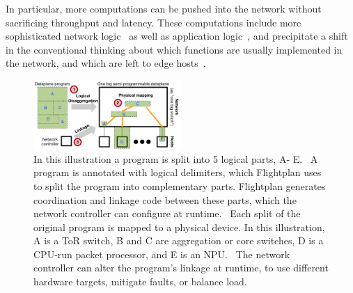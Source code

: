 \documentclass[letterpaper,twocolumn,10pt]{article}
\begin{document}
In particular, more computations can be pushed into the network
without sacrificing throughput and latency.  These computations
include more sophisticated network
logic~\cite{Giesen:2018:ICR:3229591.3229595} as well as application
logic~\cite{Jin:2017:NBK:3132747.3132764}, and precipitate a shift in
the conventional thinking about which functions are usually implemented
in the network, and which are left to edge
hosts~\cite{Saltzer:1984:EAS:357401.357402}.

\begin{figure}[t]
\centering
\includegraphics[width=0.5\textwidth]{overview.pdf}
\caption{\label{fig:overview}In this illustration a program is split into 5 logical parts, {\sf\color{blue} A}-{\sf\color{blue} E}.
{\color{red}}~A program is annotated with logical delimiters, which Flightplan uses to split the program into complementary parts. Flightplan generates coordination and linkage code between these parts, which the network controller can configure at runtime.
{\color{red}}~Each split of the original program is mapped to a physical device. In this illustration,
 {\sf\color{blue} A} is a ToR switch,
 {\sf\color{blue} B} and {\sf\color{blue} C} are aggregation or core switches,
 {\sf\color{blue} D} is a CPU-run packet processor, and
 {\sf\color{blue} E} is an NPU.
{\color{red}}~The network controller can alter the program's linkage at runtime, to use different hardware targets, mitigate faults, or balance load.
}
\end{figure}
\end{document}
